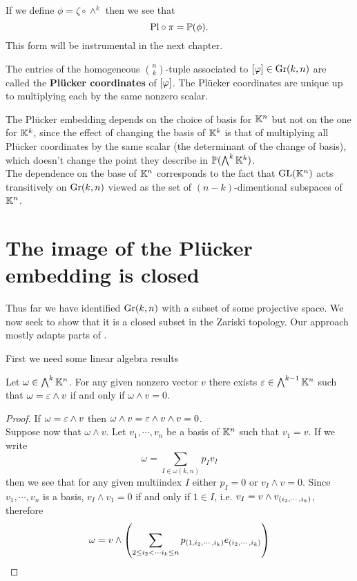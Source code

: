 \begin{remark}
If we define $\phi=\zeta\circ \wedge^k$ then we see that \[\mathrm{Pl}\circ \pi=\mathbb{P}(\phi).\]
This form will be instrumental in the next chapter.
\end{remark}

\noindent
The entries of the homogeneous $\binom nk$-tuple associated to $[\varphi]\in \mathrm{Gr}(k,n)$ are called the \textbf{Pl\"ucker coordinates} of $[\varphi]$. The Pl\"ucker coordinates are unique up to multiplying each by the same nonzero scalar.

\begin{remark}
The Pl\"ucker embedding depends on the choice of basis for $\mathbb{K}^n$ but not on the one for $\mathbb{K}^k$, since the effect of changing the basis of $\mathbb{K}^k$ is that of multiplying all Pl\"ucker coordinates by the same scalar (the determinant of the change of basis), which doesn't change the point they describe in $\mathbb{P}(\bigwedge^k\mathbb{K}^k)$.\\
The dependence on the base of $\mathbb{K}^n$ corresponds to the fact that $\mathrm{GL}(\mathbb{K}^n)$ acts transitively on $\mathrm{Gr}(k,n)$ viewed as the set of $(n-k)$-dimentional subspaces of $\mathbb{K}^n$.
\end{remark}



\section{The image of the Pl\"ucker embedding is closed}
Thus far we have identified $\mathrm{Gr}(k,n)$ with a subset of some projective space. We now seek to show that it is a closed subset in the Zariski topology. Our approach mostly adapts parts of \cite{McKernan}.
\medskip

\noindent First we need some linear algebra results

\begin{lemma}\label{Divisibility}
Let $\omega\in \bigwedge^k\mathbb{K}^n$. For any given nonzero vector $v$ there exists $\varepsilon\in \bigwedge^{k-1}\mathbb{K}^n$ such that $\omega=\varepsilon\wedge v$ if and only if $\omega\wedge v=0$.
\end{lemma}
\begin{proof}
If $\omega=\varepsilon\wedge v$ then $\omega\wedge v=\varepsilon\wedge v\wedge v=0$.\\
Suppose now that $\omega\wedge v$. Let $v_1,\cdots, v_n$ be a basis of $\mathbb{K}^n$ such that $v_1=v$. If we write
\[\omega=\sum_{I\in\omega(k,n)}p_I v_I\]
then we see that for any given multiindex $I$ either $p_I=0$ or $v_I\wedge v=0$. Since $v_1,\cdots, v_n$ is a basis, $v_I\wedge v_1=0$ if and only if $1\in I$, i.e. $v_I=v\wedge v_{\left({i_2,\cdots, i_k}\right)}$, therefore
\[\omega=v\wedge \left({\sum_{2\leq i_2<\cdots i_k\leq n} p_{\left({1,i_2,\cdots, i_k}\right)} e_{\left({i_2,\cdots, i_k}\right)}}\right)\]
\end{proof}

